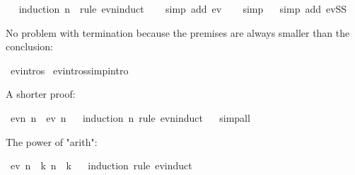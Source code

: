 \begin{isabellebody}
%
\isadelimproof
\ \ %
\endisadelimproof
%
\isatagproof
{}\isamarkupfalse%
{\isacharparenleft}{\kern0pt}induction\ n\ \ rule{\isacharcolon}{\kern0pt}\ evn{\isachardot}{\kern0pt}induct{\isacharparenright}{\kern0pt}\isanewline
\ \ \isamarkupfalse%
\ {\isacharparenleft}{\kern0pt}simp\ add{\isacharcolon}{\kern0pt}\ ev{}{\isacharparenright}{\kern0pt}\isanewline
\ \ \isamarkupfalse%
\ simp\isanewline
\ \ \isamarkupfalse%
{\isacharparenleft}{\kern0pt}simp\ add{\isacharcolon}{\kern0pt}\ evSS{\isacharparenright}{\kern0pt}\isanewline
\ \ \isamarkupfalse%
%
\endisatagproof
{\isafoldproof}%
%
\isadelimproof
%
\endisadelimproof
%
\begin{isamarkuptext}%
No problem with termination
because the premises are always smaller than the conclusion:%
\end{isamarkuptext}\isamarkuptrue%
\isamarkupfalse%
\ ev{\isachardot}{\kern0pt}intros\isanewline
{}\isamarkupfalse%
\ ev{\isachardot}{\kern0pt}intros{\isacharbrackleft}{\kern0pt}simp{\isacharcomma}{\kern0pt}intro{\isacharbrackright}{\kern0pt}%
\begin{isamarkuptext}%
A shorter proof:%
\end{isamarkuptext}\isamarkuptrue%
\isamarkupfalse%
\ {\isachardoublequoteopen}evn\ n\ {\isasymLongrightarrow}\ ev\ n{\isachardoublequoteclose}\isanewline
%
\isadelimproof
\ \ %
\endisadelimproof
%
\isatagproof
{}\isamarkupfalse%
{\isacharparenleft}{\kern0pt}induction\ n\ rule{\isacharcolon}{\kern0pt}\ evn{\isachardot}{\kern0pt}induct{\isacharparenright}{\kern0pt}\isanewline
\ \ \isamarkupfalse%
{\isacharparenleft}{\kern0pt}simp{\isacharunderscore}{\kern0pt}all{\isacharparenright}{\kern0pt}\isanewline
\ \ \isamarkupfalse%
%
\endisatagproof
{\isafoldproof}%
%
\isadelimproof
%
\endisadelimproof
%
\begin{isamarkuptext}%
The power of "arith":%
\end{isamarkuptext}\isamarkuptrue%
\isamarkupfalse%
\ {\isachardoublequoteopen}ev\ n\ {\isasymLongrightarrow}\ {\isasymexists}k{\isachardot}{\kern0pt}\ n\ {\isacharequal}{\kern0pt}\ {}{\isacharasterisk}{\kern0pt}k{\isachardoublequoteclose}\isanewline
%
\isadelimproof
\ \ %
\endisadelimproof
%
\isatagproof
{}\isamarkupfalse%
{\isacharparenleft}{\kern0pt}induction\ rule{\isacharcolon}{\kern0pt}\ ev{\isachardot}{\kern0pt}induct{\isacharparenright}{\kern0pt}\isanewline

\end{isabellebody}
